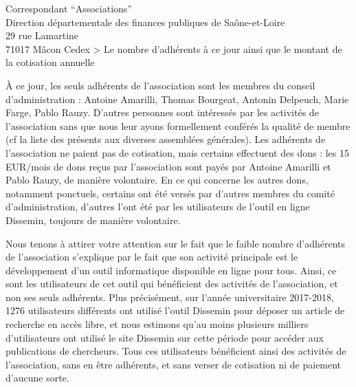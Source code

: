 \documentclass[11pt]{lettre}
\begin{document}
\begin{letter}{Correspondant ``Associations''\\Direction départementale des finances publiques de Saône-et-Loire\\29 rue Lamartine\\71017 Mâcon Cedex}
    > Le nombre d'adhérents à ce jour ainsi que le montant de la cotisation annuelle

À ce jour, les seuls adhérents de l'association sont les membres du conseil d'administration : Antoine Amarilli, Thomas Bourgeat, Antonin Delpeuch, Marie Farge, Pablo Rauzy. D'autres personnes sont intéressés par les activités de l'association sans que nous leur ayons formellement conférés la qualité de membre (cf la liste des présents aux diverses assemblées générales). Les adhérents de l'association ne paient pas de cotisation, mais certains effectuent des dons : les 15 EUR/mois de dons reçus par l'association sont payés par Antoine Amarilli et Pablo Rauzy, de manière volontaire. En ce qui concerne les autres dons, notamment ponctuels, certains ont été versés par d'autres membres du comité d'administration, d'autres l'ont été par les utilisateurs de l'outil en ligne Dissemin, toujours de manière volontaire.

Nous tenons à attirer votre attention sur le fait que le faible nombre d'adhérents de l'association s'explique par le fait que son activité principale est le développement d'un outil informatique disponible en ligne pour tous. Ainsi, ce sont les utilisateurs de cet outil qui bénéficient des activités de l'association, et non ses seuls adhérents. Plus précisément, sur l'année universitaire 2017-2018, 1276 utilisateurs différents ont utilisé l'outil Dissemin pour déposer un article de recherche en accès libre, et nous estimons qu'au moins plusieurs milliers d'utilisateurs ont utilisé le site Dissemin sur cette période pour accéder aux publications de chercheurs. Tous ces utilisateurs bénéficient ainsi des activités de l'association, sans en être adhérents, et sans verser de cotisation ni de paiement d'aucune sorte.

\vspace{2cm}

\hspace{10cm}\begin{minipage}{6cm}
\end{minipage}

\thispagestyle{empty}
\end{letter}
\end{document}
